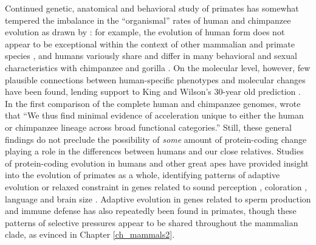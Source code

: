 Continued genetic, anatomical and behavioral study of primates has
somewhat tempered the imbalance in the ``organismal'' rates of human
and chimpanzee evolution as drawn by \citeauthor{King1975}: for
example, the evolution of human form does not appear to be exceptional
within the context of other mammalian and primate species
\citep{Carroll2003}, and humans variously share and differ in many
behavioral and sexual characteristics with chimpanzee and gorilla
\citep{Harcourt1980,Goodall1986,Vigilant2004}. On the molecular level,
however, few plausible connections between human-specific phenotypes
and molecular changes have been found, lending support to King and
Wilson's 30-year old prediction
\citep{Clark2003,Sequencing2005a,Bradley2008}. In the first comparison
of the complete human and chimpanzee genomes, \citet{Sequencing2005a}
wrote that ``We thus find minimal evidence of acceleration unique to
either the human or chimpanzee lineage across broad functional
categories.''  Still, these general findings do not preclude the
possibility of \emph{some} amount of protein-coding change playing a
role in the differences between humans and our close
relatives. Studies of protein-coding evolution in humans and other
great apes have provided insight into the evolution of primates as a
whole, identifying patterns of adaptive evolution or relaxed
constraint in genes related to sound perception \citep{Clark2003},
coloration \citep{Mundy2007}, language \citep{Enard2002} and brain
size \citep{Montgomery2011}. Adaptive evolution in genes related to
sperm production \citep{Clark2005} and immune defense
\citep{Sawyer2005a} has also repeatedly been found in primates, though
these patterns of selective pressures appear to be shared throughout
the mammalian clade, as evinced in Chapter \ref{ch_mammals2}.

